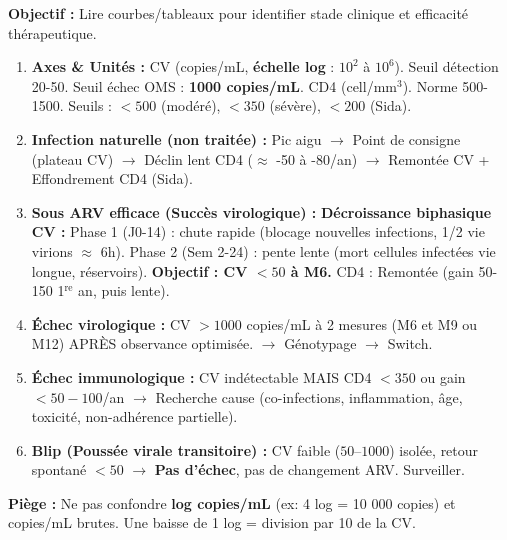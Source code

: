 \documentclass[11pt]{article}
\begin{document}
\begin{methode}
\textbf{Objectif :} Lire courbes/tableaux pour identifier stade clinique et efficacité thérapeutique.
\begin{enumerate}
    \item \textbf{Axes \& Unités :} CV (copies/mL, \textbf{échelle log} : $10^2$ à $10^6$). Seuil détection 20-50. Seuil échec OMS : \textbf{1000 copies/mL}. CD4 (cell/mm$^3$). Norme 500-1500. Seuils : $<500$ (modéré), $<350$ (sévère), $<200$ (Sida).
    \item \textbf{Infection naturelle (non traitée) :} Pic aigu $\rightarrow$ Point de consigne (plateau CV) $\rightarrow$ Déclin lent CD4 ($\approx$ -50 à -80/an) $\rightarrow$ Remontée CV + Effondrement CD4 (Sida).
    \item \textbf{Sous ARV efficace (Succès virologique) :} \textbf{Décroissance biphasique CV :} Phase 1 (J0-14) : chute rapide (blocage nouvelles infections, 1/2 vie virions $\approx$ 6h). Phase 2 (Sem 2-24) : pente lente (mort cellules infectées vie longue, réservoirs). \textbf{Objectif : CV $< 50$ à M6.} CD4 : Remontée (gain 50-150 1$^{\text{re}}$ an, puis lente).
    \item \textbf{Échec virologique :} CV $> 1000$ copies/mL à 2 mesures (M6 et M9 ou M12) APRÈS observance optimisée. $\rightarrow$ Génotypage $\rightarrow$ Switch.
    \item \textbf{Échec immunologique :} CV indétectable MAIS CD4 $< 350$ ou gain $< 50-100$/an $\rightarrow$ Recherche cause (co-infections, inflammation, âge, toxicité, non-adhérence partielle).
    \item \textbf{Blip (Poussée virale transitoire) :} CV faible ($50$--$1000$) isolée, retour spontané $< 50$ $\rightarrow$ \textbf{Pas d'échec}, pas de changement ARV. Surveiller.
\end{enumerate}
\textbf{Piège :} Ne pas confondre \textbf{log copies/mL} (ex: 4 log = 10 000 copies) et copies/mL brutes. Une baisse de 1 log = division par 10 de la CV.
\end{methode}
\end{document}

